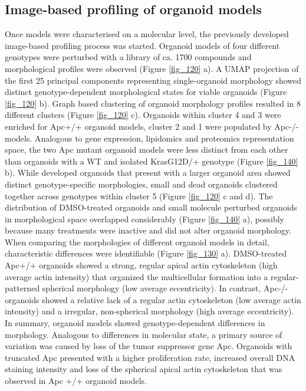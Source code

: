 \begin{flushleft}
\newpage
\section{Image-based profiling of organoid models}

Once models were characterised on a molecular level, the previously developed image-based profiling process was started. Organoid models of four different genotypes were perturbed with a library of ca. 1700 compounds and morphological profiles were observed (Figure \ref{fig_120} a). A UMAP projection of the first 25 principal components representing single-organoid morphology showed distinct genotype-dependent morphological states for viable organoids (Figure \ref{fig_120} b). Graph based clustering of organoid morphology profiles resulted in 8 different clusters (Figure \ref{fig_120} c). Organoids within cluster 4 and 3 were enriched for Apc+/+ organoid models, cluster 2 and 1 were populated by Apc-/- models. Analogous to gene expression, lipidomics and proteomics representation space, the two Apc mutant organoid models were less distinct from each other than organoids with a WT and isolated KrasG12D/+ genotype (Figure \ref{fig_140} b). While developed organoids that present with a larger organoid area showed distinct genotype-specific morphologies, small and dead organoids clustered together across genotypes within cluster 5 (Figure \ref{fig_120} c and d). The distribution of DMSO-treated organoids and small molecule perturbed organoids in morphological space overlapped considerably (Figure \ref{fig_140} a), possibly because many treatments were inactive and did not alter organoid morphology. When comparing the morphologies of different organoid models in detail, characteristic differences were identifiable (Figure \ref{fig_130} a). DMSO-treated Apc+/+ organoids showed a strong, regular apical actin cytoskeleton (high average actin intensity) that organized the multicellular formation into a regular-patterned spherical morphology (low average eccentricity). In contrast, Apc-/- organoids showed a relative lack of a regular actin cytoskeleton (low average actin intensity) and a irregular, non-spherical morphology (high average eccentricity). In summary, organoid models showed genotype-dependent differences in morphology. Analogous to differences in molecular state, a primary source of variation was caused by loss of the tumor suppressor gene Apc. Organoids with truncated Apc presented with a higher proliferation rate, increased overall DNA staining intensity and loss of the spherical apical actin cytoskeleton that was observed in Apc +/+ organoid models.


\end{flushleft}
